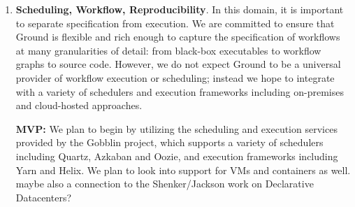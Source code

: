 \begin{enumerate}
\item \textbf{Scheduling, Workflow, Reproducibility}. In this domain, it is important to separate specification from execution.  We are committed to ensure that Ground is flexible and rich enough to capture the specification of workflows at many granularities of detail: from black-box executables to workflow graphs to source code.  However, we do not expect Ground to be a universal provider of workflow execution or scheduling; instead we hope to integrate with a variety of schedulers and execution frameworks including on-premises and cloud-hosted approaches.

\textbf{MVP:} We plan to begin by utilizing the scheduling and execution services provided by the Gobblin project, which supports a variety of schedulers including Quartz, Azkaban and Oozie, and execution frameworks including Yarn and Helix.  We plan to look into support for VMs and containers as well.    maybe also a connection to the Shenker/Jackson work on Declarative Datacenters?
\end{enumerate}